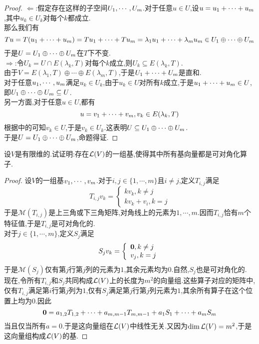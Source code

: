 \documentclass{ctexart}
\begin{document}
\begin{proof}
    $\Leftarrow$:假定存在这样的子空间${U}_1,\cdots,{U}_{m}$.对于任意$u\in U$,设$u={u}_1+\cdots+{u}_{m}$,其中$u_k\in U_k$对每个$k$都成立.\\
    那么我们有
    \[Tu=T({u}_1+\cdots+{u}_{m})={Tu}_1+\cdots+{Tu}_{m}=\lambda_1u_1+\cdots+\lambda_mu_m\in{U}_1\oplus\cdots\oplus{U}_{m}\]
    于是$U={U}_1\oplus\cdots\oplus{U}_{m}$在$T$下不变.\\
    $\Rightarrow$:令$U_k=U\cap E(\lambda_k,T)$对每个$k$成立,则$U_k\subseteq E(\lambda_k,T)$.\\
    由于$V=E(\lambda_1,T)\oplus\cdots\oplus E(\lambda_m,T)$,于是${U}_1+\cdots+{U}_{m}$是直和.\\
    对于任意${u}_1,\cdots,{u}_{m}$满足$u_k\in U_k$,由于$u_k\in U$对所有$k$成立,于是${u}_1+\cdots+{u}_{m}\in U$,即${U}_1\oplus\cdots\oplus{U}_{m}\subseteq U$.\\
    另一方面,对于任意$u\in U$,都有
    \[u={v}_1+\cdots+{v}_{m},v_k\in E(\lambda_k,T)\]
    根据中的可知$v_k\in U$,于是$v_k\in U_k$.这表明$U\subseteq{U}_1\oplus\cdots\oplus{U}_{m}$.\\
    于是$U={U}_1\oplus\cdots\oplus{U}_{m}$,命题得证.
\end{proof}
\begin{problem}[17.]
    设$V$是有限维的.试证明:存在$\mathcal{L}(V)$的一组基,使得其中所有基向量都是可对角化算子.
\end{problem}
\begin{proof}
    设$V$的一组基${v}_1,\cdots,{v}_{m}$.对于$i,j\in\{1,\cdots,m\}$且$i\neq j$,定义$T_{i,j}$满足
    \[T_{i,j}v_k=\left\{\begin{array}{l}
        kv_k,k\neq j\\
        kv_k+v_i,k=j
    \end{array}\right.\]
    于是$\mathcal{M}(T_{i,j})$是上三角或下三角矩阵,对角线上的元素为$1,\cdots,m$.因而$T_{i,j}$恰有$m$个特征值,于是$T_{i,j}$是可对角化的.\\
    对于$j\in\{1,\cdots,m\}$,定义$S_j$满足
    \[S_jv_k=\left\{\begin{array}{l}
        \mathbf0,k\neq j\\
        v_j,k=j
    \end{array}\right.\]
    于是$\mathcal{M}(S_j)$仅有第$j$行第$j$列的元素为$1$,其余元素均为$0$.自然,$S_j$也是可对角化的.\\
    现在,令所有$T_{i,j}$和$S_j$共同构成$\mathcal{L}(V)$上的长度为$m^2$的向量组.这些算子对应的矩阵中,仅有$T_{i,j}$满足第$i$行第$j$列为$1$,仅有$S_j$满足第$j$行第$j$列元素为$1$,其余所有算子在这个位置上均为$0$.因此
    \[\mathbf0=a_{1,2}T_{1,2}+\cdots+a_{m,m-1}T_{m,m-1}+a_1S_1+\cdots+a_mS_m\]
    当且仅当所有$a=0$.于是这向量组在$\mathcal{L}(V)$中线性无关.又因为$\dim\mathcal{L}(V)=m^2$,于是这向量组构成$\mathcal{L}(V)$的基.
\end{proof}
\end{document}
